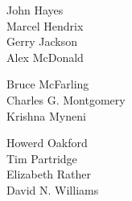 \begin{minipage}[t]{.3\linewidth}
John		Hayes \\
Marcel		Hendrix \\
Gerry		Jackson \\
Alex		McDonald \\
\end{minipage}
\hfill
\begin{minipage}[t]{.3\linewidth}
Bruce		McFarling \\
Charles G.	Montgomery \\
Krishna		Myneni \\
\end{minipage}
\hfill
\begin{minipage}[t]{.3\linewidth}
Howerd		Oakford \\
Tim			Partridge \\
Elizabeth	Rather \\
David N.	Williams \\
\end{minipage}
